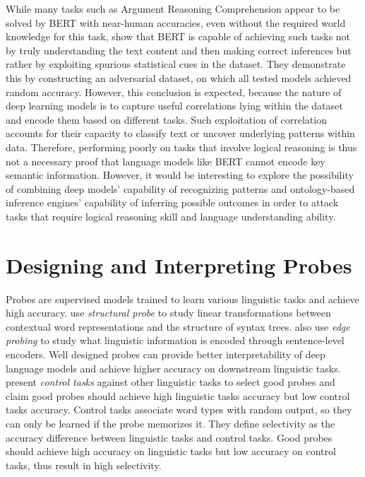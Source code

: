 \documentclass[11pt,a4paper]{article}
\begin{document}
While many tasks such as Argument Reasoning Comprehension appear to be solved by BERT with near-human accuracies, even without the required world knowledge for this task, \cite{niven2019probing} show that BERT is capable of achieving such tasks not by truly understanding the text content and then making correct inferences but rather by exploiting spurious statistical cues in the dataset. They demonstrate this by constructing an adversarial dataset, on which all tested models achieved random accuracy. 
However, this conclusion is expected, because the nature of deep learning models is to capture useful correlations lying within the dataset and encode them based on different tasks.
Such exploitation of correlation accounts for their capacity to classify text or uncover underlying patterns within data. 
Therefore, performing poorly on tasks that involve logical reasoning is thus not a necessary proof that language models like BERT cannot encode key semantic information. 
However, it would be interesting to explore the possibility of combining deep models' capability of recognizing patterns and ontology-based inference engines' capability of inferring possible outcomes in order to attack tasks that require logical reasoning skill and language understanding ability.

\section{Designing and Interpreting Probes}
    Probes are supervised models trained to learn various linguistic tasks and achieve high accuracy. \cite{hewitt-manning-2019-structural} use \textit{structural probe} to study linear transformations between contextual word representations and the structure of syntax trees.  \cite{tenney2019bert} also use \textit{edge probing} to study what linguistic information is encoded through sentence-level encoders. Well designed probes can provide better interpretability of deep language models and achieve higher accuracy on downstream linguistic tasks. \cite{hewitt2019designing} present \textit{control tasks} against other linguistic tasks to select good probes and claim good probes should achieve high linguistic tasks accuracy but low control tasks accuracy. Control tasks associate word types with random output, so they can only be learned if the probe memorizes it. They define selectivity as the accuracy difference between linguistic tasks and control tasks. Good probes should achieve high accuracy on linguistic tasks but low accuracy on control tasks, thus result in high selectivity. 
\end{document}

